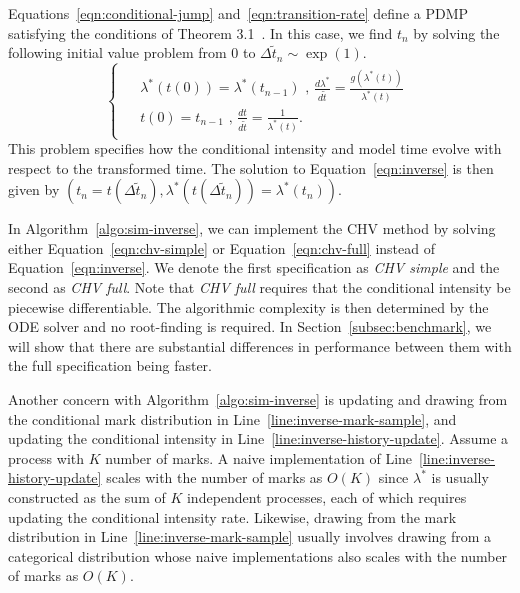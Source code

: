 \documentclass{juliacon}
\numberwithin{equation}{section}
\begin{document}
Equations~\ref{eqn:conditional-jump} and~\ref{eqn:transition-rate} define a PDMP satisfying the conditions of Theorem 3.1~\cite{veltz2015}. In this case, we find \( t_n \) by solving the following initial value problem from \( 0 \) to \( \Delta \tilde{t}_n \sim \exp(1) \).
\begin{equation} \label{eqn:chv-full}
  \begin{cases}
  \begin{aligned}
    & \lambda^\ast (t(0)) = \lambda^\ast (t_{n-1}) \text{ , } \frac{d \lambda^\ast}{d \tilde{t}} =  \frac{g(\lambda^\ast(t))}{\lambda^\ast (t)} \\
    & t (0) = t_{n-1} \text{ , } \frac{d t}{d \tilde{t} } = \frac{1}{\lambda^\ast (t)}.
  \end{aligned}
  \end{cases}
\end{equation}
This problem specifies how the conditional intensity and model time evolve with respect to the transformed time. The solution to Equation~\ref{eqn:inverse} is then given by \( ( t_n = t(\Delta \tilde{t}_n), \lambda^\ast(t(\Delta \tilde{t}_n)) =  \lambda^\ast(t_n)) \).

In Algorithm~\ref{algo:sim-inverse}, we can implement the CHV method by solving either Equation~\ref{eqn:chv-simple} or Equation~\ref{eqn:chv-full} instead of Equation~\ref{eqn:inverse}. We denote the first specification as \textit{CHV simple} and the second as \textit{CHV full}. Note that \textit{CHV full} requires that the conditional intensity be piecewise differentiable. The algorithmic complexity is then determined by the ODE solver and no root-finding is required. In Section~\ref{subsec:benchmark}, we will show that there are substantial differences in performance between them with the full specification being faster. %

Another concern with Algorithm~\ref{algo:sim-inverse} is updating and drawing from the conditional mark distribution in Line~\ref{line:inverse-mark-sample}, and updating the conditional intensity in Line~\ref{line:inverse-history-update}. Assume a process with \( K \) number of marks. A naive implementation of Line~\ref{line:inverse-history-update} scales with the number of marks as \( O(K) \) since \( \lambda^\ast \) is usually constructed as the sum of \( K \) independent processes, each of which requires updating the conditional intensity rate. Likewise, drawing from the mark distribution in Line~\ref{line:inverse-mark-sample} usually involves drawing from a categorical distribution whose naive implementations also scales with the number of marks as \( O(K) \).
\end{document}
